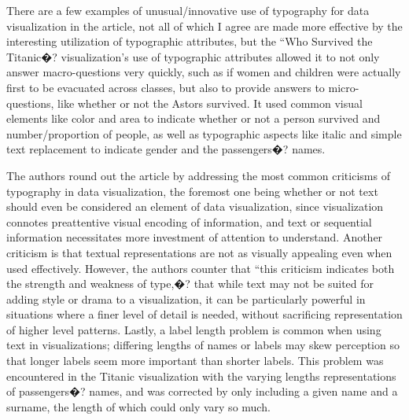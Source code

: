 \documentclass[]{book}
\theoremstyle{definition}
\theoremstyle{definition}
\theoremstyle{definition}
\theoremstyle{remark}
\begin{document}
There are a few examples of unusual/innovative use of typography for
data visualization in the article, not all of which I agree are made
more effective by the interesting utilization of typographic attributes,
but the ``Who Survived the Titanic�? visualization's use of typographic
attributes allowed it to not only answer macro-questions very quickly,
such as if women and children were actually first to be evacuated across
classes, but also to provide answers to micro-questions, like whether or
not the Astors survived. It used common visual elements like color and
area to indicate whether or not a person survived and number/proportion
of people, as well as typographic aspects like italic and simple text
replacement to indicate gender and the passengers�? names.

The authors round out the article by addressing the most common
criticisms of typography in data visualization, the foremost one being
whether or not text should even be considered an element of data
visualization, since visualization connotes preattentive visual encoding
of information, and text or sequential information necessitates more
investment of attention to understand. Another criticism is that textual
representations are not as visually appealing even when used
effectively. However, the authors counter that ``this criticism
indicates both the strength and weakness of type,�? that while text may
not be suited for adding style or drama to a visualization, it can be
particularly powerful in situations where a finer level of detail is
needed, without sacrificing representation of higher level patterns.
Lastly, a label length problem is common when using text in
visualizations; differing lengths of names or labels may skew perception
so that longer labels seem more important than shorter labels. This
problem was encountered in the Titanic visualization with the varying
lengths representations of passengers�? names, and was corrected by only
including a given name and a surname, the length of which could only
vary so much.
\end{document}
